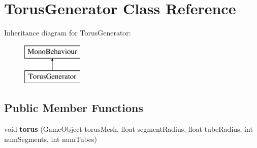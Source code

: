 \hypertarget{class_torus_generator}{}\section{Torus\+Generator Class Reference}
\label{class_torus_generator}
Inheritance diagram for Torus\+Generator\+:\begin{figure}[H]
\begin{center}
\leavevmode
\includegraphics[height=2.000000cm]{class_torus_generator}
\end{center}
\end{figure}
\subsection*{Public Member Functions}
\begin{DoxyCompactItemize}
\item 
void {\bfseries torus} (Game\+Object torus\+Mesh, float segment\+Radius, float tube\+Radius, int num\+Segments, int num\+Tubes)\hypertarget{class_torus_generator_ace97cc7d5209d135b935407b7a554f50}{}\label{class_torus_generator_ace97cc7d5209d135b935407b7a554f50}

\end{DoxyCompactItemize}
